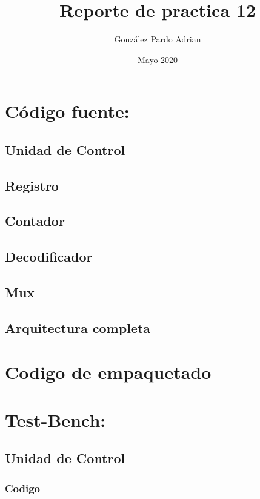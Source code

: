 \documentclass[8pt,executivepaper]{article}
\author{González Pardo Adrian}
\date{Mayo 2020}
\title{Reporte de practica 12}
\begin{document}
\maketitle
\section{Código fuente:}
\subsection{Unidad de Control}

\subsection{Registro}

\subsection{Contador}

\subsection{Decodificador}

\subsection{Mux}

\subsection{Arquitectura completa}


\section{Codigo de empaquetado}





\section{Test-Bench:}
\subsection{Unidad de Control}
\subsubsection{Codigo}

\end{document}
